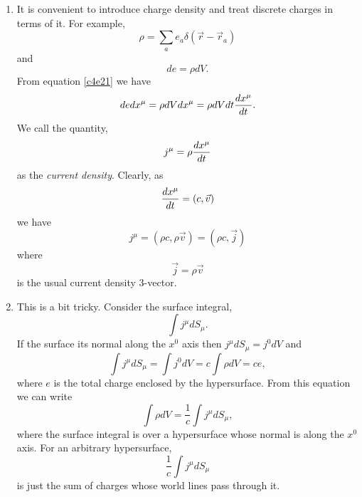 \begin{enumerate}
\item It is convenient to introduce charge density and treat discrete charges in
terms of it. For example,
\begin{equation}\label{c4e20}
\rho = \sum_a e_a\delta(\vec{r} - \vec{r}_a)
\end{equation}
and
\begin{equation}\label{c4e21}
de = \rho dV.
\end{equation}
From equation \eqref{c4e21} we have
\begin{equation}\label{c4e22}
de dx^\mu = \rho dV dx^\mu = \rho dV dt \frac{d{x^\mu}}{d{t}}.
\end{equation}
We call the quantity,
\begin{equation}\label{c4e23}
j^\mu = \rho\frac{d{x^\mu}}{d{t}}
\end{equation}
as the \emph{current density}. Clearly, as 
\[
\frac{d{x^\mu}}{d{t}} = (c, \vec{v})
\]
we have
\begin{equation}\label{c4e24}
j^\mu = (\rho c, \rho\vec{v}) = (\rho c, \vec{j})
\end{equation}
where
\begin{equation}\label{c4e25}
\vec{j} = \rho\vec{v}
\end{equation}
is the usual current density 3-vector.

\item This is a bit tricky. Consider the surface integral,
\[
\int j^\mu dS_\mu.
\]
If the surface its normal along the $x^0$ axis then $j^\mu dS_\mu = j^0 dV$ and
\[
\int j^\mu dS_\mu = \int j^0 dV = c\int \rho dV = ce,
\]
where $e$ is the total charge enclosed by the hypersurface. From this equation
we can write
\begin{equation}\label{c4e26}
\int\rho dV = \frac{1}{c}\int j^\mu dS_\mu,
\end{equation}
where the surface integral is over a hypersurface whose normal is along the $x^0$
axis. For an arbitrary hypersurface,
\[
\frac{1}{c}\int j^\mu dS_\mu
\]
is just the sum of charges whose world lines pass through it.


\end{enumerate}

